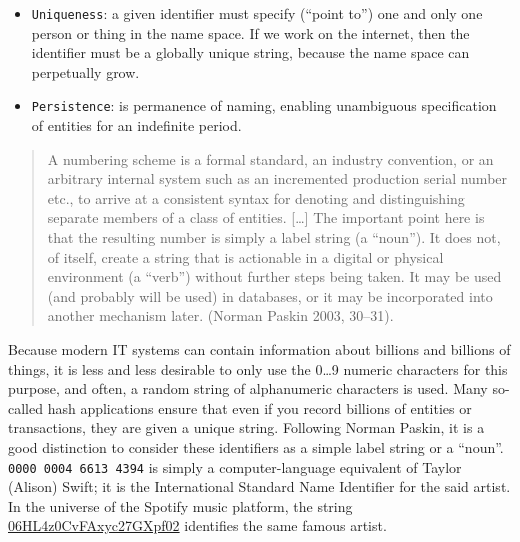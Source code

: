 \documentclass[
  letterpaper,
  DIV=11,
  numbers=noendperiod]{scrreprt}
\begin{document}
\begin{itemize}
\item
  \texttt{Uniqueness}: a given identifier must specify (``point to'')
  one and only one person or thing in the name space. If we work on the
  internet, then the identifier must be a globally unique string,
  because the name space can perpetually grow.
\item
  \texttt{Persistence}: is permanence of naming, enabling unambiguous
  specification of entities for an indefinite period.
\end{itemize}

\begin{quote}
A numbering scheme is a formal standard, an industry convention, or an
arbitrary internal system such as an incremented production serial
number etc., to arrive at a consistent syntax for denoting and
distinguishing separate members of a class of entities. {[}\ldots{]} The
important point here is that the resulting number is simply a label
string (a ``noun''). It does not, of itself, create a string that is
actionable in a digital or physical environment (a ``verb'') without
further steps being taken. It may be used (and probably will be used) in
databases, or it may be incorporated into another mechanism later.
(Norman Paskin 2003, 30--31).
\end{quote}

Because modern IT systems can contain information about billions and
billions of things, it is less and less desirable to only use the
0\ldots9 numeric characters for this purpose, and often, a random string
of alphanumeric characters is used. Many so-called hash applications
ensure that even if you record billions of entities or transactions,
they are given a unique string. Following Norman Paskin, it is a good
distinction to consider these identifiers as a simple label string or a
``noun''. \texttt{0000\ 0004\ 6613\ 4394} is simply a computer-language
equivalent of Taylor (Alison) Swift; it is the International Standard
Name Identifier for the said artist. In the universe of the Spotify
music platform, the string
\href{https://open.spotify.com/artist/06HL4z0CvFAxyc27GXpf02}{06HL4z0CvFAxyc27GXpf02}
identifies the same famous artist.
\end{document}
